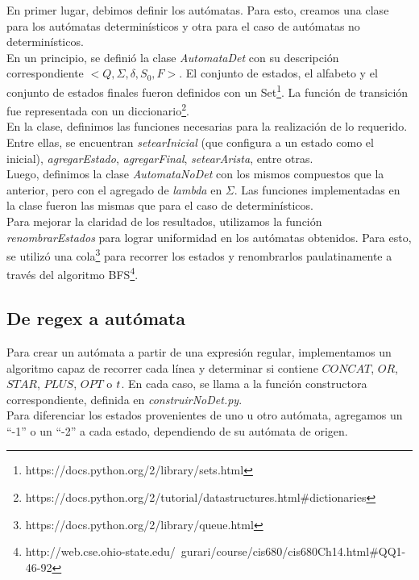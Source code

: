\documentclass[a4paper, 10pt, twoside]{article}
\begin{document}
En primer lugar, debimos definir los autómatas. Para esto, creamos una clase para los autómatas determinísticos y otra para el caso de autómatas no determinísticos.\\
\newline
En un principio, se definió la clase \textit{AutomataDet} con su descripción correspondiente $<Q, \Sigma, \delta, S_0, F>$. El conjunto de estados, el alfabeto y el conjunto de estados finales fueron definidos con un Set\footnote{https://docs.python.org/2/library/sets.html}. La función de transición fue representada con un diccionario\footnote{https://docs.python.org/2/tutorial/datastructures.html\#dictionaries}.\\
\newline
En la clase, definimos las funciones necesarias para la realización de lo requerido. Entre ellas, se encuentran \textit{setearInicial} (que configura a un estado como el inicial), \textit{agregarEstado}, \textit{agregarFinal}, \textit{setearArista}, entre otras.\\
\newline
Luego, definimos la clase \textit{AutomataNoDet} con los mismos compuestos que la anterior, pero con el agregado de \textit{lambda} en $\Sigma$. Las funciones implementadas en la clase fueron las mismas que para el caso de determinísticos.\\
\newline
Para mejorar la claridad de los resultados, utilizamos la función \textit{renombrarEstados} para lograr uniformidad en los autómatas obtenidos. Para esto, se utilizó una cola\footnote{https://docs.python.org/2/library/queue.html} para recorrer los estados y renombrarlos paulatinamente a través del algoritmo BFS\footnote{http://web.cse.ohio-state.edu/~gurari/course/cis680/cis680Ch14.html\#QQ1-46-92}.

\subsection{De regex a autómata}
Para crear un autómata a partir de una expresión regular, implementamos un algoritmo capaz de recorrer cada línea y determinar si contiene ${CONCAT}$, ${OR}$, ${STAR}$, ${PLUS}$, ${OPT}$ o $\\t$. En cada caso, se llama a la función constructora correspondiente, definida en \textit{construirNoDet.py}.\\
\newline
Para diferenciar los estados provenientes de uno u otro autómata, agregamos un ``-1'' o un ``-2'' a cada estado, dependiendo de su autómata de origen.
\end{document}
